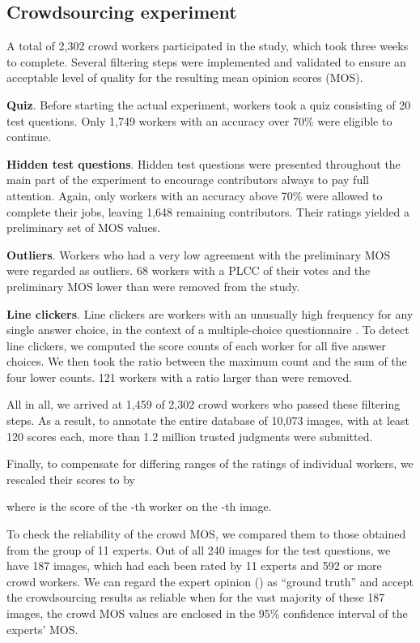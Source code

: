 \documentclass[10pt,journal,compsoc]{IEEEtran}
\begin{document}
\subsection{Crowdsourcing experiment}

A total of 2,302 crowd workers participated in the study, which took three weeks to complete.  Several filtering steps were implemented and validated to ensure an acceptable level of quality for the resulting mean opinion scores (MOS).

{\smallskip \noindent \textbf{Quiz}.} Before starting the actual experiment, workers took a quiz consisting of 20 test questions. Only 1,749 workers with an accuracy over 70\% were eligible to continue.  

{\smallskip \noindent \textbf{Hidden test questions}.} Hidden test questions were presented throughout the main part of the experiment to encourage contributors always to pay full attention. Again, only workers with an accuracy above 70\% were allowed to complete their jobs, leaving 1,648 remaining contributors. Their ratings yielded a preliminary set of MOS values. 

{\smallskip \noindent \textbf{Outliers}.} Workers who had a very low agreement with the preliminary MOS were regarded as outliers. 68 workers with a PLCC of their votes and the preliminary MOS lower than  were removed from the study.

{\smallskip \noindent \textbf{Line clickers}.} Line clickers are workers with an unusually high frequency for any single answer choice, in the context of a multiple-choice questionnaire \cite{QoMEXReliability}. To detect line clickers, we computed the score counts of each worker for all five answer choices. We then took the ratio between the maximum count and the sum of the four lower counts. 121 workers with a ratio larger than  were removed.

\smallskip
All in all, we arrived at 1,459 of 2,302 crowd workers who passed these filtering steps. As a result, to annotate the entire database of 10,073 images, with at least 120 scores each, more than 1.2 million trusted judgments were submitted. 

Finally, to compensate for differing ranges of the ratings of individual workers, we rescaled their scores to  by

where  is the score of the -th worker on the -th image. 

To check the reliability of the crowd MOS, we compared them to those obtained from the group of 11 experts. Out of all 240 images for the test questions, we have 187 images, which had each been rated by 11 experts and 592 or more crowd workers. We can regard the expert opinion () as ``ground truth'' and accept the crowdsourcing results as reliable when for the vast majority of these 187 images, the crowd MOS values are enclosed in the 95\% confidence interval of the experts' MOS.
\end{document}

